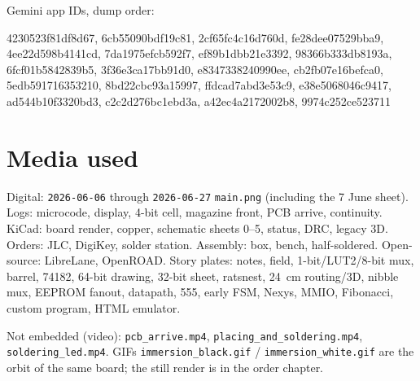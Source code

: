 \documentclass[11pt,openany]{book}
\begin{document}
\bigskip
\noindent Gemini app IDs, dump order:

{\scriptsize\raggedright\ttfamily
4230523f81df8d67,
6cb55090bdf19c81,
2cf65fc4c16d760d,
fe28dee07529bba9,
4ee22d598b4141cd,
7da1975efcb592f7,
ef89b1dbb21e3392,
98366b333db8193a,
6fcf01b5842839b5,
3f36e3ca17bb91d0,
e8347338240990ee,
cb2fb07e16befca0,
5edb591716353210,
8bd22cbc93a15997,
ffdcad7abd3e53c9,
e38e5068046c9417,
ad544b10f3320bd3,
c2c2d276bc1ebd3a,
a42ec4a2172002b8,
9974c252ce523711
\par}

\chapter{Media used}

Digital: \texttt{2026-06-06} through \texttt{2026-06-27} \texttt{main.png} (including the 7 June sheet). Logs: microcode, display, 4-bit cell, magazine front, PCB arrive, continuity. KiCad: board render, copper, schematic sheets 0--5, status, DRC, legacy 3D. Orders: JLC, DigiKey, solder station. Assembly: box, bench, half-soldered. Open-source: LibreLane, OpenROAD. Story plates: notes, field, 1-bit/LUT2/8-bit mux, barrel, 74182, 64-bit drawing, 32-bit sheet, ratsnest, 24~cm routing/3D, nibble mux, EEPROM fanout, datapath, 555, early FSM, Nexys, MMIO, Fibonacci, custom program, HTML emulator.

Not embedded (video): \texttt{pcb\_arrive.mp4}, \texttt{placing\_and\_soldering.mp4}, \texttt{soldering\_led.mp4}. GIFs \texttt{immersion\_black.gif} / \texttt{immersion\_white.gif} are the orbit of the same board; the still render is in the order chapter.
\end{document}
